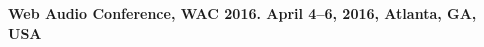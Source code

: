 \colorbox{qmuldarkblue}
{
 \color{white}
 \parbox{\textwidth}
 {

  \begin{center}

  
\textbf{Web Audio Conference, WAC 2016. April 4--6, 2016, Atlanta, GA, USA}
  
  \end{center}

  \vspace{-2cm}
 }
}
